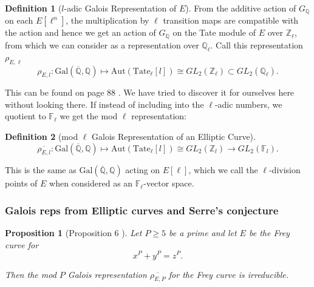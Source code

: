 \documentclass{article}
\newtheorem{proposition}{Proposition}[section]
\theoremstyle{definition}
\newtheorem{definition}{Definition}[section]
\theoremstyle{definition}
\theoremstyle{definition}
\newcommand{\tate}{\operatorname{Tate_{\ell}}}
\newcommand{\galq}{\operatorname{Gal(\overline{\Q},\Q)}}
\newcommand{\Z}{\mathbb{Z}}
\newcommand{\Q}{\mathbb{Q}}
\newcommand{\F}{\mathbb{F}}
\begin{document}
    \begin{definition} [$l$-adic Galois Representation of $E$]
 From the additive action of $G_\Q$ on each $E[\ell^n]$, the multiplication by $\ell$ transition maps are compatible with the action and hence we get an action of $G_\Q$ on the Tate module of $E$ over $\Z_\ell$, from which we can consider as a representation over $\Q_\ell$. Call this representation $\rho_{E,\ell}$
  $$\rho_{E, l}: \text{Gal}(\overline{\Q},\Q)\mapsto \text{Aut}(\tate[l])\cong GL_2(\mathbb{\Z}_\ell)\subset GL_2(\mathbb{\Q}_\ell).$$


  
\end{definition}

This can be found on page 88 \cite{Silverman}. We have tried to discover it for ourselves here without looking there.
\newline\newline
If instead of including into the $\ell$-adic numbers, we quotient to $\F_\ell$ we get the mod $\ell$ representation:

\begin{definition}[mod $\ell$ Galois Representation of an Elliptic Curve]
 $$\overline{\rho_{E, l}}: \text{Gal}(\overline{\Q},\Q)\mapsto \text{Aut}(\tate[l])\cong GL_2(\mathbb{\Z}_l)\to GL_2(\mathbb{F}_l).$$

This is the same as $\galq$ acting on $E[\ell]$, which we call the $\ell$-division points of $E$ when considered as an $\F_\ell$-vector space.


    
\end{definition}


\subsubsection{Galois reps from Elliptic curves and Serre's conjecture}


\begin{proposition}[Proposition 6 \cite{Serre}]

Let $P\geq5$ be a prime and let $E$ be the Frey curve for 
$$x^P+y^P=z^P.$$

Then the mod $P$ Galois representation $\overline{\rho_{E, P}}$ for the Frey curve is irreducible.
    
\end{proposition}
\end{document}
